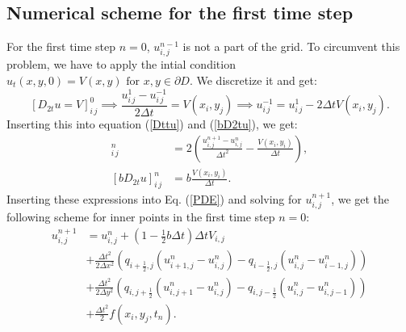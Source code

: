 \documentclass[twoside]{article}
\begin{document}
\subsection{Numerical scheme for the first time step}
For the first time step $n = 0$, $u^{n-1}_{i,j}$ is not a part of the grid. To circumvent this problem, we have to apply the intial condition $u_t(x,y,0) = V(x,y) \text{ for } x,y \in \partial D$. We discretize it and get:
$$[D_{2t} u = V]_{i\,j}^0 \implies \frac{u_{i\,j}^1 - u_{i\,j}^{-1}}{2\Delta t} = V(x_i,y_j) \implies u_{i\,j}^{-1} = u_{i\,j}^{1} - 2\Delta t V(x_i,y_j).$$
Inserting this into equation (\ref{Dttu}) and (\ref{bD2tu}), we get:
\begin{align}
[D_t D_t u]_{i\, j}^n &= 2\left(\frac{u^{n+1}_{i,j} - u^{n}_{i,j}}{\Delta t^2}  - \frac{V(x_i,y_i)}{\Delta t}\right), \\
[bD_{2t} u]_{i\, j}^n &= b\frac{V(x_i,y_i)}{\Delta t}. \label{bD2tu2}
\end{align}
Inserting these expressions into Eq. (\ref{PDE}) and solving for $u^{n+1}_{i,j}$, we get the following scheme for inner points in the first time step $n = 0$:
\begin{align}
u^{n+1}_{i,j} &= u^{n}_{i,j} + \left( 1 - \frac{1}{2}b\Delta t\right)\Delta t V_{i,j} \nonumber \\
&+ \frac{\Delta t^2}{2\Delta x^2} \left( q_{i +\frac{1}{2},j}(u^{n}_{i+1,j} - u^{n}_{i,j}) - q_{i -\frac{1}{2},j}(u^{n}_{i,j} - u^{n}_{i-1,j})\right) \nonumber \\ 
&+  \frac{\Delta t^2}{2\Delta y^2} \left( q_{i,j +\frac{1}{2}}(u^{n}_{i,j+1} - u^{n}_{i,j}) - q_{i ,j-\frac{1}{2}}(u^{n}_{i,j} - u^{n}_{i,j-1})\right) \nonumber \\
 &+ \frac{\Delta t^2}{2} f(x_{i}, y_{j}, t_{n}).
\end{align}
\end{document}
